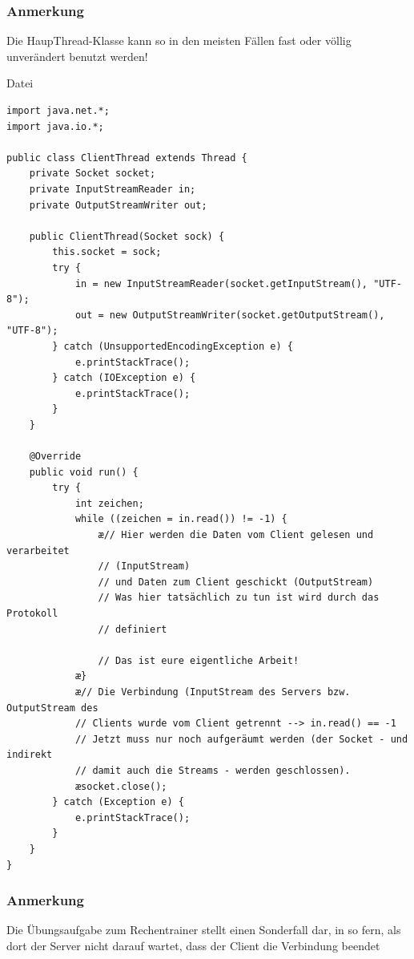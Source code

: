 \subsubsection{Anmerkung}

Die HaupThread-Klasse kann so in den meisten Fällen fast oder völlig
unverändert benutzt werden!

\pagebreak

Datei 

\begin{lstlisting}
import java.net.*;
import java.io.*;

public class ClientThread extends Thread {
    private Socket socket;
    private InputStreamReader in;
    private OutputStreamWriter out;

    public ClientThread(Socket sock) {
        this.socket = sock;
        try {
            in = new InputStreamReader(socket.getInputStream(), "UTF-8");
            out = new OutputStreamWriter(socket.getOutputStream(), "UTF-8");
        } catch (UnsupportedEncodingException e) {
            e.printStackTrace();
        } catch (IOException e) {
            e.printStackTrace();
        }
    }

    @Override
    public void run() {
        try {
            int zeichen;
            while ((zeichen = in.read()) != -1) {
                æ// Hier werden die Daten vom Client gelesen und verarbeitet
                // (InputStream)
                // und Daten zum Client geschickt (OutputStream)
                // Was hier tatsächlich zu tun ist wird durch das Protokoll
                // definiert

                // Das ist eure eigentliche Arbeit!
            æ}
            æ// Die Verbindung (InputStream des Servers bzw. OutputStream des
            // Clients wurde vom Client getrennt --> in.read() == -1
            // Jetzt muss nur noch aufgeräumt werden (der Socket - und indirekt
            // damit auch die Streams - werden geschlossen).
            æsocket.close();
        } catch (Exception e) {
            e.printStackTrace();
        }
    }
}
\end{lstlisting}

\subsubsection{Anmerkung}

Die Übungsaufgabe zum Rechentrainer stellt einen Sonderfall dar, in so fern,
als dort der Server nicht darauf wartet, dass der Client die Verbindung beendet

